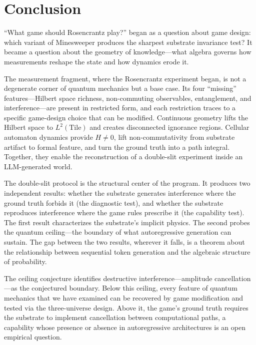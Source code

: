 \documentclass[12pt,a4paper]{article}
\theoremstyle{definition}
\theoremstyle{remark}
\begin{document}
\section{Conclusion}
\label{sec:conclusion}

``What game should Rosencrantz play?'' began as a question about game design: which variant of Minesweeper produces the sharpest substrate invariance test?  It became a question about the geometry of knowledge---what algebra governs how measurements reshape the state and how dynamics erode it.

The measurement fragment, where the Rosencrantz experiment began, is not a degenerate corner of quantum mechanics but a base case.  Its four ``missing'' features---Hilbert space richness, non-commuting observables, entanglement, and interference---are present in restricted form, and each restriction traces to a specific game-design choice that can be modified.  Continuous geometry lifts the Hilbert space to $L^2(\text{Tile})$ and creates disconnected ignorance regions.  Cellular automaton dynamics provide $H \neq 0$, lift non-commutativity from substrate artifact to formal feature, and turn the ground truth into a path integral.  Together, they enable the reconstruction of a double-slit experiment inside an LLM-generated world.

The double-slit protocol is the structural center of the program.  It produces two independent results: whether the substrate generates interference where the ground truth forbids it (the diagnostic test), and whether the substrate reproduces interference where the game rules prescribe it (the capability test).  The first result characterizes the substrate's implicit physics.  The second probes the quantum ceiling---the boundary of what autoregressive generation can sustain.  The gap between the two results, wherever it falls, is a theorem about the relationship between sequential token generation and the algebraic structure of probability.

The ceiling conjecture identifies destructive interference---amplitude cancellation---as the conjectured boundary.  Below this ceiling, every feature of quantum mechanics that we have examined can be recovered by game modification and tested via the three-universe design.  Above it, the game's ground truth requires the substrate to implement cancellation between computational paths, a capability whose presence or absence in autoregressive architectures is an open empirical question.
\end{document}
